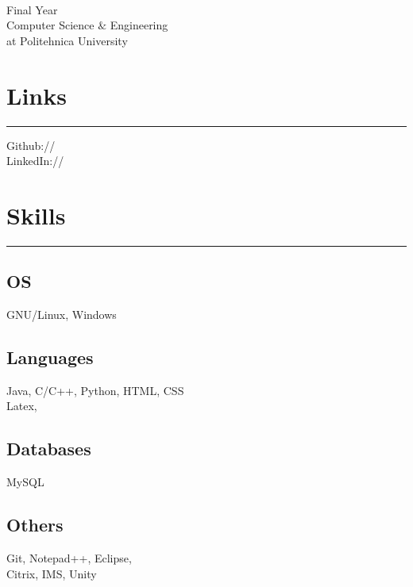 \documentclass[]{mihocandreea-resume}
\begin{document}
%
%

\begin{minipage}[t]{0.33\textwidth} 
\begin{large}
	\\
\end{large}
Final Year \\
Computer Science $\&$  Engineering\\ 
at Politehnica University \\ 
\section{Links} 
\noindent\rule{5cm}{0.4pt}

Github:// \href{https://github.com/MihocAndreea}{} \\
LinkedIn://  \href{https://www.linkedin.com/in/andreea-mihoc-a5bb54184/}{} \\
\section{Skills}
\noindent\rule{5cm}{0.4pt}
\subsection{OS}
GNU/Linux, Windows
\vspace{6pt}
\subsection{Languages}
Java, C/C++, Python, HTML, CSS\\
Latex, 
\vspace{6pt}
\subsection{Databases}
MySQL
\vspace{6pt}
\subsection{Others}
Git, Notepad++, Eclipse,\\
Citrix, IMS, Unity


\end{minipage}
\end{document}

